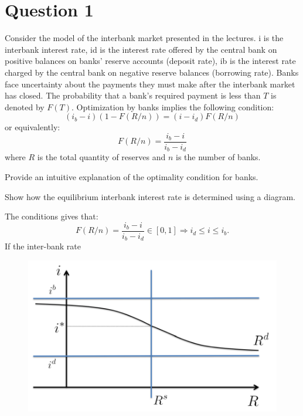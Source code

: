 \section*{Question 1}

Consider the model of the interbank market presented in the lectures. i is the interbank interest rate, id
is the interest rate offered by the central bank on positive balances on banks' reserve accounts (deposit
rate), ib is the interest rate charged by the central bank on negative reserve balances (borrowing rate).
Banks face uncertainty about the payments they must make after the interbank market has closed. The
probability that a bank's required payment is less than $T$ is denoted by $F(T)$. Optimization by banks
implies the following condition:
\[(i_b - i)\left(1 - F(R/n)\right)= (i -i_d)F(R/n)\] 
or equivalently:
\[F(R/n) = \frac{i_b - i}{i_{b} - i_d}\]
where $R$ is the total quantity of reserves and $n$ is the number of banks.

\begin{problem*}[1]
    Provide an intuitive explanation of the optimality condition for banks.
\end{problem*}

\begin{solution}
    
\end{solution}

\begin{problem*}[2]
    Show how the equilibrium interbank interest rate is determined using a diagram.
\end{problem*}

\begin{solution}
    The conditions gives that:
    \[
    F(R/n) = \frac{i_{b} -i}{i_{b} -i_d} \in [0, 1] \Rightarrow i_d \leq i \leq i_{b} .
    \]
    If the inter-bank rate 
    \begin{figure}[h!]
        \centering
        \includegraphics*{figures/PS5(2).png}
    \end{figure}
\end{solution}

